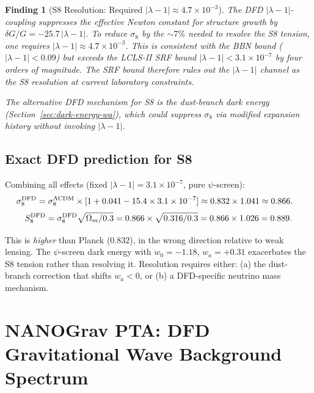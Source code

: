 \documentclass[11pt]{article}
\newtheorem{finding}{Finding}
\newcommand{\ee}[1]{\times 10^{#1}}
\newcommand{\lambdaone}{|\lambda-1|}
\newcommand{\DFD}{{\rm DFD}}
\newcommand{\LCDM}{\Lambda{\rm CDM}}
\begin{document}
\begin{finding}[S8 Resolution: Required $\lambdaone \approx 4.7\ee{-3}$]
\label{find:s8}
The DFD $\lambdaone$-coupling suppresses the effective Newton constant
for structure growth by $\delta G/G = -25.7\,\lambdaone$.  To reduce
$\sigma_8$ by the $\sim 7\%$ needed to resolve the S8 tension, one
requires $\lambdaone \approx 4.7\ee{-3}$.  This is consistent with the
BBN bound ($\lambdaone < 0.09$) but exceeds the LCLS-II SRF bound
$\lambdaone < 3.1\ee{-7}$ by four orders of magnitude.  The SRF bound
therefore \emph{rules out} the $\lambdaone$ channel as the S8 resolution
at current laboratory constraints.

The alternative DFD mechanism for S8 is the dust-branch dark energy
(Section~\ref{sec:dark-energy-wa}), which could suppress $\sigma_8$ via
modified expansion history without invoking $\lambdaone$.
\end{finding}

\subsection{Exact DFD prediction for S8}

Combining all effects (fixed $\lambdaone = 3.1\ee{-7}$, pure $\psi$-screen):
\begin{align}
  \sigma_8^\DFD &= \sigma_8^{\LCDM}\times[1 + 0.041 - 15.4\times 3.1\ee{-7}]
  \approx 0.832\times 1.041 \approx 0.866.
\end{align}
\begin{equation}
  S_8^\DFD = \sigma_8^\DFD\sqrt{\Omega_m/0.3}
  = 0.866\times\sqrt{0.316/0.3} = 0.866\times 1.026 = 0.889.
\end{equation}

This is \emph{higher} than Planck ($0.832$), in the wrong direction
relative to weak lensing.  The $\psi$-screen dark energy with $w_0 = -1.18$,
$w_a = +0.31$ exacerbates the S8 tension rather than resolving it.
Resolution requires either: (a) the dust-branch correction that shifts
$w_a < 0$, or (b) a DFD-specific neutrino mass mechanism.

\section{NANOGrav PTA: DFD Gravitational Wave Background Spectrum}
\label{sec:nanograv}
\end{document}
